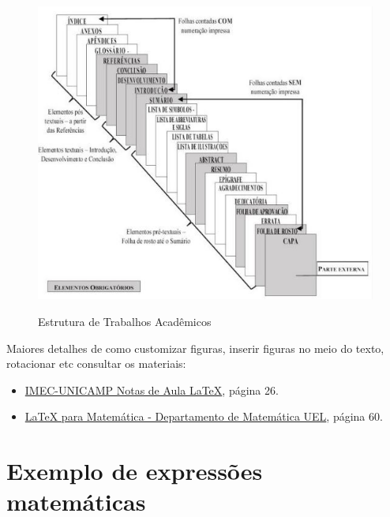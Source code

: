 \begin{figure}[htbp]
\hypertarget{arquitetura}{%
\caption{Estrutura de Trabalhos Acadêmicos}\label{fig:estr_trab_academicos}
\begin{center}
\includegraphics{material-de-apoio/figuras/estrutura_monografias.JPG}\\
\end{center}
}
\end{figure}

Maiores detalhes de como customizar figuras, inserir figuras no meio do texto, rotacionar etc consultar os materiais:
\begin{itemize}
    \item \hyperlink{https://www.ime.unicamp.br/~marchesi/Allegati/NotasdeAulaLaTeX.pdf}{IMEC-UNICAMP Notas de Aula \LaTeX{}}, página 26.
    \item \hyperlink{http://www.uel.br/projetos/matessencial/superior/pdfs/latexmat.pdf}{\LaTeX{} para Matemática - Departamento de Matemática UEL}, página 60.
\end{itemize}
\newpage
\section{Exemplo de expressões matemáticas}

